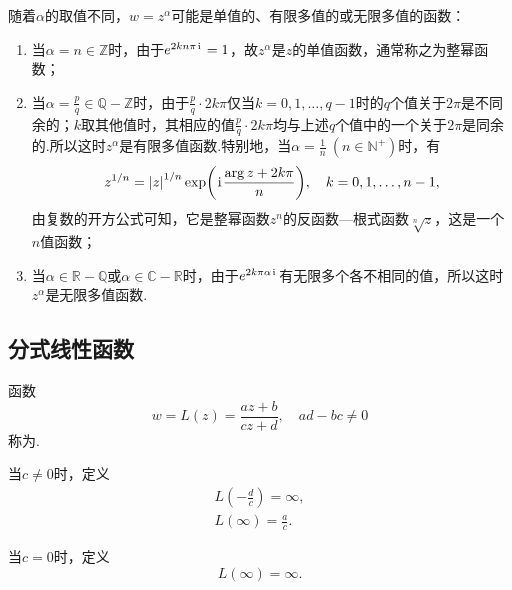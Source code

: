 \begin{property}
随着\(\alpha\)的取值不同，\(w=z^\alpha\)可能是单值的、有限多值的或无限多值的函数：
\begin{enumerate}
\item 当\(\alpha=n\in\mathbb{Z}\)时，由于\(e^{2 k n \pi \kern1pt\mathrm{i}\kern1pt}=1\)，故\(z^\alpha\)是\(z\)的单值函数，通常称之为整幂函数；
\item 当\(\alpha=\frac{p}{q}\in\mathbb{Q}-\mathbb{Z}\)时，由于\(\frac{p}{q} \cdot 2 k \pi\)仅当\(k=0,1,\dots,q-1\)时的\(q\)个值关于\(2\pi\)是不同余的；\(k\)取其他值时，其相应的值\(\frac{p}{q} \cdot 2 k \pi\)均与上述\(q\)个值中的一个关于\(2\pi\)是同余的.所以这时\(z^\alpha\)是有限多值函数.特别地，当\(\alpha=\frac{1}{n}\ (n\in\mathbb{N}^+)\)时，有\begin{equation*}
z^{1/n} = \abs{z}^{1/n} \exp(\kern1pt\mathrm{i}\kern1pt\frac{\arg z + 2 k \pi}{n}), \quad k=0,1,\dotsc,n-1,
\end{equation*}由复数的开方公式可知，它是整幂函数\(z^n\)的反函数---根式函数\(\sqrt[n]{z}\)，这是一个\(n\)值函数；
\item 当\(\alpha\in\mathbb{R}-\mathbb{Q}\)或\(\alpha\in\mathbb{C}-\mathbb{R}\)时，由于\(e^{2 k \pi \alpha \kern1pt\mathrm{i}\kern1pt}\)有无限多个各不相同的值，所以这时\(z^\alpha\)是无限多值函数.
\end{enumerate}
\end{property}

\subsection{分式线性函数}
\begin{definition}
函数\begin{equation*}
w = L(z) = \frac{a z + b}{c z + d}, \quad ad-bc \neq 0
\end{equation*}称为.

当\(c \neq 0\)时，定义\begin{gather*}
	L\left(-\frac{d}{c}\right) = \infty, \\
	L(\infty) = \frac{a}{c}.
\end{gather*}

当\(c = 0\)时，定义\begin{equation*}
L(\infty) = \infty.
\end{equation*}
\end{definition}
